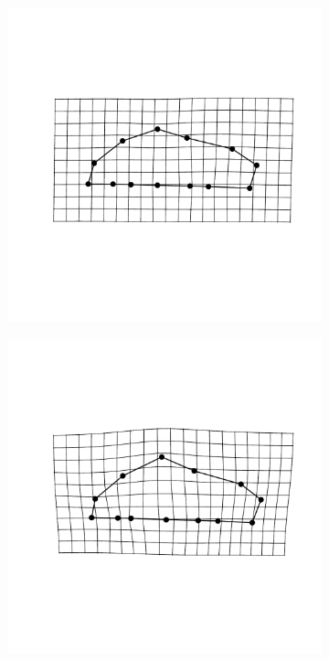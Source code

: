 \documentclass[12pt,letterpaper]{article}\usepackage{graphicx, color}
\begin{document}
\begin{figure}[ht]
  \centering
  \begin{subfigure}[b]{0.4\textwidth}
    \centering
    \includegraphics[width = \textwidth]{figure/mshape_1}
    \label{fig:mean_shape1}
  \end{subfigure}
  \begin{subfigure}[b]{0.4\textwidth}
    \centering
    \includegraphics[width = \textwidth]{figure/mshape_2}
    \label{fig:mean_shape2}
  \end{subfigure}


\end{figure}
\end{document}
